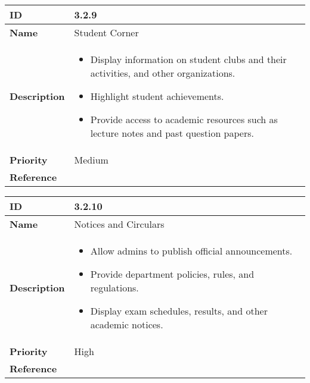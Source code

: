 \begin{center}
\begin{tabular}{ | >{\bfseries}m{5em} | m{10cm} |  } 
  \hline
  ID & 3.2.9\\  
  \hline
  Name & Student Corner \\  
  \hline
  Description & 
  \begin{itemize}
      \item Display information on student clubs and their activities, and other organizations.
      \item Highlight student achievements.
      \item Provide access to academic resources such as lecture notes and past question papers.
  \end{itemize} \\ 
  \hline
  Priority & Medium\\
  \hline 
  Reference & \\
  \hline
\end{tabular}
\end{center}

\vspace{0.5cm}

\begin{center}
  \begin{tabular}{ | >{\bfseries}m{5em} | m{10cm} |  } 
    \hline
    ID & 3.2.10\\  
    \hline
    Name & Notices and Circulars \\  
    \hline
    Description & 
    \begin{itemize}
        \item Allow admins to publish official announcements.
        \item Provide department policies, rules, and regulations.
        \item Display exam schedules, results, and other academic notices.
    \end{itemize} \\ 
    \hline
    Priority & High\\
    \hline 
    Reference & \\
    \hline
    
  \end{tabular}
\end{center}

\vspace{0.5cm}


